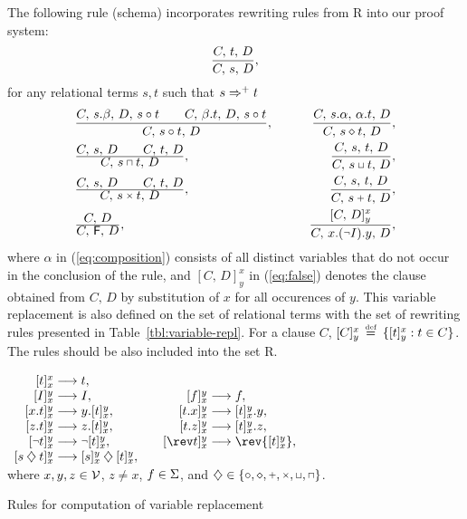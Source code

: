 The following rule (schema) incorporates rewriting rules from \C R into our
proof system:
\begin{equation}\label {eq:rewriting}
{\displaystyle C ,\,t ,\, D \over \displaystyle C ,\,s ,\,D},
\end{equation}
for any relational terms $s,t$ such that \( s\Rightarrow^+ t\)
\begin{eqnarray}
\prule{C,\, s.\beta ,\, D ,\, s\comp t\qquad  C,\, \beta.t ,\, D,\, s\comp
t}{C,\, s\comp t,\, D},
&\qquad & \label{eq:composition}
\prule{C,\, s.\alpha ,\,\alpha.t ,\, D}{C,\, s\duck t,\, D},
\\
\omit$
\prule{C,\, s,\, D\qquad  C,\, t,\, D}{C,\, s\meet t,\, D},
$ \hfil
& & \label{eq:choice}
\prule{C,\, s,\, t,\, D}{C,\, s\join t,\, D},
\\
\omit$
\prule{C,\, s,\, D\qquad  C,\, t,\, D}{C,\, s\pro t,\, D},
$ \hfil
& & \label{eq:product}
\prule{C,\, s,\, t,\, D}{C,\, s\plu t,\, D},
\\
\omit$
\prule{C,\, D}{C,\,\false ,\, D},
$ \hfil
& & \label{eq:false}
\prule{[C,\, D]^x_y}{C,\, x.(\Neg\ident).y,\, D},
\end{eqnarray}
where $\alpha$ in (\ref {eq:composition}) consists of all distinct variables
that do not occur in the conclusion of the rule, and \([C,\, D]^x_y\) in
(\ref {eq:false}) denotes the clause obtained from $C,\,D$ by substitution of
$x$ for all occurences of $y$.  This variable replacement is also  defined on
the set of relational terms with the set of rewriting rules presented in
Table~\ref {tbl:variable-repl}.  For a clause $C$, \([C]^x_y\,\mathrel {\stackrel {\mbox {\tiny def}}{=}\:} \{[t]^x_y :
t\in C\}\).  The rules should be also included into the set \C R. 
\begin{table}[htb]
\hspace*{\fill}\(
\begin{array}{r@{\;\rewr\;}l@{\qquad}r@{\;\rewr\;}l}
\varre txx & t,\\
\varre Iyx & I, & \varre fyx & f,\\
\varre {x.t}yx & y.\varre tyx, & \varre {t.x}yx & \varre tyx.y,\\
\varre {z.t}yx & z.\varre tyx, & \varre {t.z}yx & \varre tyx.z,\\
\varre {\Neg t}yx & \Neg \varre tyx, & \varre {\rev t}yx & \rev{\varre tyx},\\
\varre {s\mathbin{\diamondsuit} t}yx & \varre syx \mathbin{\diamondsuit} \varre tyx,\\
\end{array}\)\hspace*{\fill}\\[1ex]
where \(x,y,z\in{\cal V}\), \(z\neq x\), \(f\in \Sigma\), and \(\diamondsuit \in
\{\comp ,\duck ,\plu ,\pro ,\join ,\meet\}\).
\caption{Rules for computation of variable replacement}\label{tbl:variable-repl}
\end{table}

